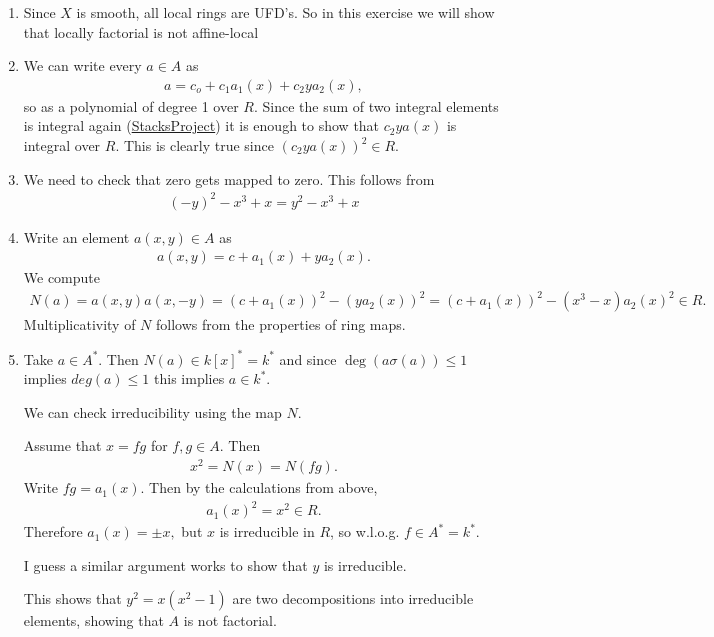 \newcommand{\sheet}{12}




\maketitle{}

\begin{exercise}{3}
    \begin{enumerate}
        \item Since $X$ is smooth, all local rings are UFD's. So in this exercise we will show that locally factorial is not affine-local
        \item We can write every $a\in A$ as 
        \begin{align*}
            a=c_o+c_1a_1(x)+c_2ya_2(x),
        \end{align*}
        so as a polynomial of degree 1 over $R$. Since the sum of two integral elements is integral again (\href{https://stacks.math.columbia.edu/tag/00GO}{StacksProject})
        it is enough to show that $c_2ya(x)$ is integral over $R$. This is clearly true since $(c_2ya(x))^2\in R$.
        \item We need to check that zero gets mapped to zero. This follows from
        \begin{align*}
            (-y)^2-x^3+x=y^2-x^3+x
        \end{align*}
        \item Write an element $a(x,y)\in A$ as 
        \begin{align*}
            a(x,y)=c+a_1(x)+ya_2(x).
        \end{align*}
        We compute 
        \begin{align*}
            N(a)=a(x,y)a(x,-y)=(c+a_1(x))^2-(ya_2(x))^2=(c+a_1(x))^2-(x^3-x)a_2(x)^2\in R.
        \end{align*}
        Multiplicativity of $N$ follows from the properties of ring maps.
        \item Take $a\in A^*$. Then $N(a)\in k[x]^*=k^*$ and since $\deg(a\sigma(a))\leq 1$ implies $deg(a)\leq 1$ this implies $a\in k^*$.

        We can check irreducibility using the map $N.$

        Assume that $x=fg$ for $f,g\in A$. Then
        \begin{align*}
            x^2=N(x)=N(fg).
        \end{align*}
        Write $fg=a_1(x)$. Then by the calculations from above,
        \begin{align*}
            a_1(x)^2=x^2 \in R.
        \end{align*}
        Therefore $a_1(x)=\pm x,$ but $x$ is irreducible in $R$, so w.l.o.g. $f\in A^*=k^*$. 

        I guess a similar argument works to show that $y$ is irreducible.

        This shows that $y^2=x(x^2-1)$ are two decompositions into irreducible elements, showing that $A$ is not 
        factorial.
    \end{enumerate}
\end{exercise}


